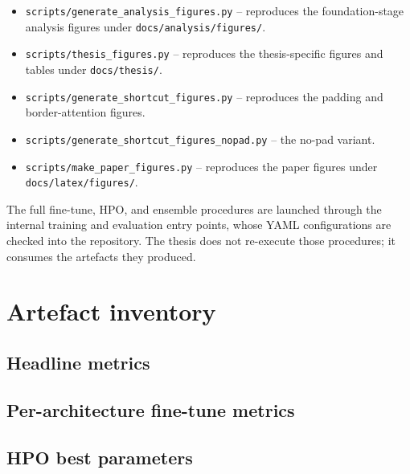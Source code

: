 \documentclass[../preamble.tex]{subfiles}
\begin{document}
\begin{itemize}
  \item \texttt{scripts/generate\_analysis\_figures.py} -- reproduces the
        foundation-stage analysis figures under
        \texttt{docs/analysis/figures/}.
  \item \texttt{scripts/thesis\_figures.py} -- reproduces the thesis-specific
        figures and tables under \texttt{docs/thesis/}.
  \item \texttt{scripts/generate\_shortcut\_figures.py} -- reproduces the
        padding and border-attention figures.
  \item \texttt{scripts/generate\_shortcut\_figures\_nopad.py} -- the
        no-pad variant.
  \item \texttt{scripts/make\_paper\_figures.py} -- reproduces the paper
        figures under \texttt{docs/latex/figures/}.
\end{itemize}

The full fine-tune, HPO, and ensemble procedures are launched through the
internal training and evaluation entry points, whose YAML configurations are
checked into the repository. The thesis does not re-execute those procedures;
it consumes the artefacts they produced.

\section{Artefact inventory}
\label{app:repro-artifacts}

\subsection*{Headline metrics}

\subsection*{Per-architecture fine-tune metrics}

\subsection*{HPO best parameters}
\end{document}
